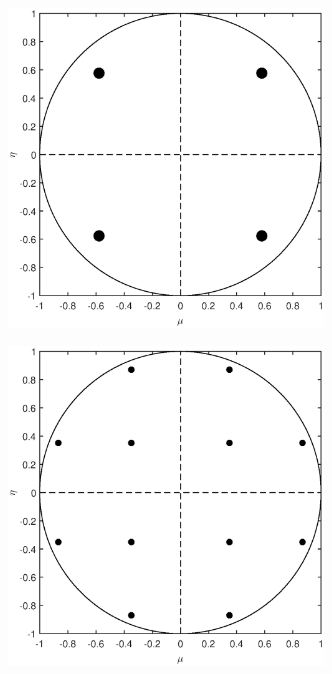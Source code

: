 \begin{figure}
\centering
	\begin{subfigure}[b]{0.48\textwidth}
		\centering
		\includegraphics[width=0.92\textwidth]{figures/sec_Sn/LS2_2D.eps}
		\caption{}
	\end{subfigure}
	\hfill
	\begin{subfigure}[b]{0.48\textwidth}
		\centering
		\includegraphics[width=0.92\textwidth]{figures/sec_Sn/LS4_2D.eps}

\end{subfigure}
\end{figure}

